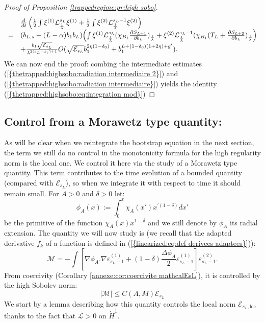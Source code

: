 \documentclass[11pt,a4paper,reqno]{amsart}
\theoremstyle{remark}
\numberwithin{equation}{section}
\begin{document}
\begin{proof}[Proof of Proposition \ref{trappedregime:pr:high sobo}]
\begin{equation}
\begin{array}{l l l l}
&\frac{d}{dt} \left( \frac{1}{2}\int \xi^{(1)}\mathcal{L}_{\frac{1}{\lambda}}^{s_L} \xi^{(1)} +\frac{1}{2} \int \xi^{(2)} \mathcal{L}_{\frac{1}{\lambda}}^{s_L-1} \xi^{(2)}  \right) \\
=& (b_{L,s}+(L-\alpha)b_1b_L)\Bigl{(} \int \xi^{(1)} \mathcal{L}^{s_L}_{\frac{1}{\lambda}}(\chi_{B_1}\frac{\partial S_{L+1}}{\partial b_L})_{\frac{1}{\lambda}} + \xi^{(2)} \mathcal{L}^{s_L-1}_{\frac{1}{\lambda}}(\chi_{B_1}(T_L+\frac{\partial S_{L+2}}{\partial b_L})_{\frac{1}{\lambda}} \Bigr{)} \\
&+\frac{b_1\sqrt{\mathcal{E}_{s_L}}}{\lambda^{2(s_L-s_c)+1}}O(\sqrt{\mathcal{E}_{s_L}}b_1^{2\eta(1-\delta_0)}+b_1^{L+(1-\delta_0)(1+2\eta)+g'}).
\end{array}
\end{equation} 
We can now end the proof: combing the intermediate estimates {{\rm (\ref{{thetrapped:highsobo:radiation intermediaire 2}})}} and {{\rm (\ref{{thetrapped:highsobo:radiation intermediaire}})}} yields the identity {{\rm (\ref{{thetrapped:highsobo:eq:integration mod}})}}
\end{proof}

\subsection{Control from a Morawetz type quantity:}

As will be clear when we reintegrate the bootstrap equation in the next section, the term we still do no control in the monotonicity formula for the high regularity norm is the local one. We control it here via the study of a Morawetz type quantity. This term contributes to the time evolution of a bounded quantity (compared with $\mathcal{E}_{s_L}$), so when we integrate it with respect to time it should remain small. For $A>0$ and $\delta>0$ let:
\begin{equation} \label{thetrapped:eq:def phiA}
\phi_A(x):=\int_0^x \chi_A (x')x^{'(1-\delta)}dx' 
\end{equation}
be the primitive of the function $\chi_A (x)x^{1-\delta}$ and we still denote by $\phi_A$ its radial extension. The quantity we will now study is (we recall that the adapted derivative $f_k$ of a function is defined in {{\rm (\ref{{linearized:eq:def derivees adaptees}})}}):
\begin{equation}\label{thetrapped:eq:definition M}
\mathcal{M}= -\int [\nabla \phi_A .\nabla \varepsilon^{(1)}_{s_L-1}+(1-\delta) \frac{\Delta \phi_A}{2}\varepsilon^{(1)}_{s_L-1}] \varepsilon^{(2)}_{s_L-1} .
\end{equation}
From coercivity (Corollary \ref{annexe:cor:coercivite mathcalEsL}), it is controlled by the high Sobolev norm:
\begin{equation}\label{thetrapped:eq:morawetz controle par high sobo}
|\mathcal{M} |\leq  C(A,M) \mathcal{E}_{s_L}
\end{equation}
We start by a lemma describing how this quantity controls the local norm $\mathcal{E}_{s_L,\text{loc}}$ thanks to the fact that $\mathcal{L}>0$ on $\dot{H}^1$.
\end{document}
